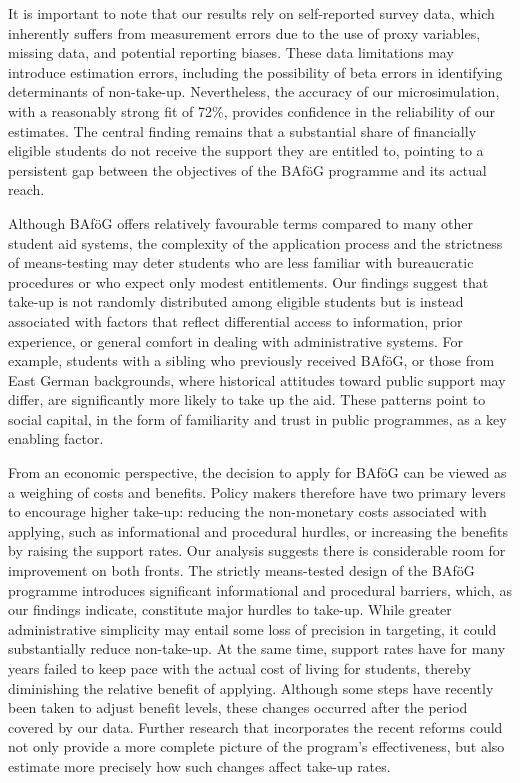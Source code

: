 It is important to note that our results rely on self-reported survey data, which inherently suffers from measurement errors due to the use of proxy variables, missing data, and potential reporting biases. These data limitations may introduce estimation errors, including the possibility of beta errors in identifying determinants of non-take-up. Nevertheless, the accuracy of our microsimulation, with a reasonably strong fit of 72\%, provides confidence in the reliability of our estimates. The central finding remains that a substantial share of financially eligible students do not receive the support they are entitled to, pointing to a persistent gap between the objectives of the BAföG programme and its actual reach.

Although BAföG offers relatively favourable terms compared to many other student aid systems, the complexity of the application process and the strictness of means-testing may deter students who are less familiar with bureaucratic procedures or who expect only modest entitlements. Our findings suggest that take-up is not randomly distributed among eligible students but is instead associated with factors that reflect differential access to information, prior experience, or general comfort in dealing with administrative systems. For example, students with a sibling who previously received BAföG, or those from East German backgrounds, where historical attitudes toward public support may differ, are significantly more likely to take up the aid. These patterns point to social capital, in the form of familiarity and trust in public programmes, as a key enabling factor.

From an economic perspective, the decision to apply for BAföG can be viewed as a weighing of costs and benefits. Policy makers therefore have two primary levers to encourage higher take-up: reducing the non-monetary costs associated with applying, such as informational and procedural hurdles, or increasing the benefits by raising the support rates. Our analysis suggests there is considerable room for improvement on both fronts. The strictly means-tested design of the BAföG programme introduces significant informational and procedural barriers, which, as our findings indicate, constitute major hurdles to take-up. While greater administrative simplicity may entail some loss of precision in targeting, it could substantially reduce non-take-up. At the same time, support rates have for many years failed to keep pace with the actual cost of living for students, thereby diminishing the relative benefit of applying. Although some steps have recently been taken to adjust benefit levels, these changes occurred after the period covered by our data. Further research that incorporates the recent reforms could not only provide a more complete picture of the program’s effectiveness, but also estimate more precisely how such changes affect take-up rates.

